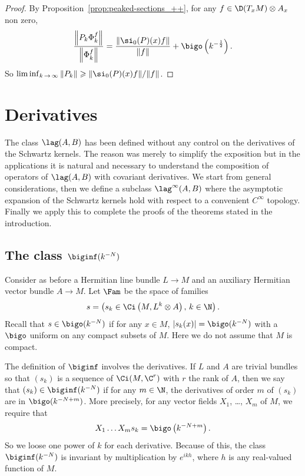 \begin{proof}
By Proposition~\ref{prop:peaked-sections_++}, for any $f \in \D (T_xM) \otimes A_x$ non zero,
\[
\frac{\left\| P_k \Phi_k^f\right\|}{\left\| \Phi_k^f\right\|} = \frac{ \| \si_0 (P) (x) f
\|}{\| f \| } + \bigo \left(k^{-\frac{1}{2}}\right).
\]
So $ \liminf_{k\,\rightarrow\,\infty} \| P_k \| \geqslant \| \si_0 (P) (x) f
\| / \| f \|$.
\end{proof}

\section{Derivatives} \label{sec:derivatives}

The class $\lag (A, B)$ has been defined without any control on the derivatives of the Schwartz kernels. The reason was merely to simplify the exposition but in the applications it is natural and necessary to understand the composition of operators of $\lag(A, B)$ with covariant derivatives. We start from general considerations, then we define a subclass $\lag ^{\infty}(A,B)$ where the asymptotic expansion of the Schwartz kernels hold with respect to a convenient $C^{\infty}$ topology. Finally we apply this to complete the proofs of the theorems stated in the introduction.
\subsection{The class \texorpdfstring{$\biginf (k^{-N})$}{O-infinity}}

Consider as before a Hermitian line bundle $L \rightarrow M$ and an auxiliary Hermitian vector bundle $A
\rightarrow M$. Let $\Fam$ be the space of families
\[
s= \left(s_k \in \Ci \left(M, L^k \otimes A\right)
,\, k \in \N\right).
\]
Recall that $s \in \bigo (k^{-N})$ if for any $x \in M$, $|s_k (x)| = \bigo (k^{-N})$ with a $\bigo $ uniform on any compact subsets of $M$. Here we do not assume that $M$ is compact.


The definition of $\biginf$ involves the derivatives. If $L$ and $A$ are trivial bundles so that $(s_k)$ is a sequence of $\Ci (M, \C^r)$ with $r$ the rank of $A$, then we say that $(s_k) \in \biginf (k^{-N})$ if for any $m \in
\N$, the derivatives of order $m$ of $(s_k)$ are in $\bigo (k^{-N+m})$. More precisely, for any vector fields $X_1$, \ldots, $X_m$ of $M$, we require that
\begin{gather}\label{eq:derk}
X_1 \ldots X_m s_k = \bigo \left(k^{-N+m}\right).
\end{gather}
So we loose one power of $k$ for each derivative. Because of this, the class $\biginf (k^{-N})$ is invariant by multiplication by $e^{ik h}$, where $h$ is any real-valued function of $M$.


